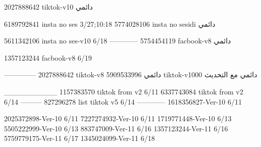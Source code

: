2027888642 tiktok-v10
دائمي

6189792841 insta no ses
3/27;10:18
5774028106 insta no sesidi
دائمي

5611342106 insta no ses-v10
6/18
------------
5754454119 facbook-v8
دائمي

1357123244 facbook-v8
6/19

--------------
2027888642 tiktok-v8
دائمي
5909533996 tiktok-v1000
دائمي مع التحديث

__________
1157383570 tiktok from v2
6/11
6337743084 tiktok from v2
6/14
---------
827296278 list tiktok v5
6/14
------------
1618356827-Ver-10
6/11

2025372898-Ver-10
6/11
7227274932-Ver-10
6/11
1719771448-Ver-10
6/13
5505222999-Ver-10
6/13
883747009-Ver-11
6/16
1357123244-Ver-11
6/16
5759779175-Ver-11
6/17
1345024099-Ver-11
6/18
